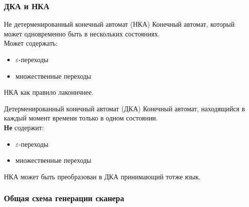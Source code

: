 \documentclass[16pt,pdf,unicode]{beamer}
\begin{document}
\begin{frame}
  \frametitle{ДКА и НКА}
  \begin{block}{Не детерменированный конечный автомат (НКА)}
    Конечный автомат, который может одновременно быть в нескольких состояниях.\\
    Может содержать:
    \begin{itemize}
      \item $\varepsilon$-переходы
      \item множественные переходы
    \end{itemize}
  \end{block}
  НКА как правило лаконичнее.
  \begin{block}{Детерменированный конечный автомат (ДКА)}
    Конечный автомат, находящийся в каждый момент времени только в одном состоянии.\\
    {\bf Не} содержит:
    \begin{itemize}
      \item $\varepsilon$-переходы
      \item множественные переходы
    \end{itemize}
  \end{block}
  НКА может быть преобразован в ДКА принимающий тотже язык.
\end{frame}

\begin{frame}
  \frametitle{Общая схема генерации сканера}
  \begin{center}
  \end{center}
\end{frame}
\end{document}
